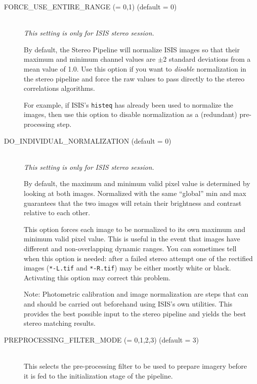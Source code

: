 \begin{description}
\item[FORCE\_USE\_ENTIRE\_RANGE \textnormal{\small{(= 0,1)}} (default = 0)] \hfill \\
  \emph{This setting is only for ISIS stereo session.}

  By default, the Stereo Pipeline will normalize ISIS images so that
  their maximum and minimum channel values are $\pm$2 standard
  deviations from a mean value of 1.0.  Use this option if you want to
  {\em disable} normalization in the stereo pipeline and force the raw
  values to pass directly to the stereo correlations algorithms.

  For example, if ISIS's \texttt{histeq} has already been used to
  normalize the images, then use this option to disable normalization
  as a (redundant) pre-processing step.


\item[DO\_INDIVIDUAL\_NORMALIZATION \textnormal (default = 0)] \hfill \\
  \emph{This setting is only for ISIS stereo session.}

  By default, the maximum and minimum valid pixel value is determined
  by looking at both images.  Normalized with the same ``global'' min
  and max guarantees that the two images will retain their brightness
  and contrast relative to each other.

  This option forces each image to be normalized to its own maximum
  and minimum valid pixel value. This is useful in the event that
  images have different and non-overlapping dynamic ranges. You can
  sometimes tell when this option is needed: after a failed stereo
  attempt one of the rectified images (\texttt{*-L.tif} and
  \texttt{*-R.tif}) may be either mostly white or black.  Activating
  this option may correct this problem.

  Note: Photometric calibration and image normalization are steps that
  can and should be carried out beforehand using ISIS's own utilities.
  This provides the best possible input to the stereo pipeline and
  yields the best stereo matching results.

\item[PREPROCESSING\_FILTER\_MODE \textnormal{\small{(= 0,1,2,3)}} (default = 3)] \hfill \\
  This selects the pre-processing filter to be used to prepare imagery
  before it is fed to the initialization stage of the pipeline.


\end{description}
